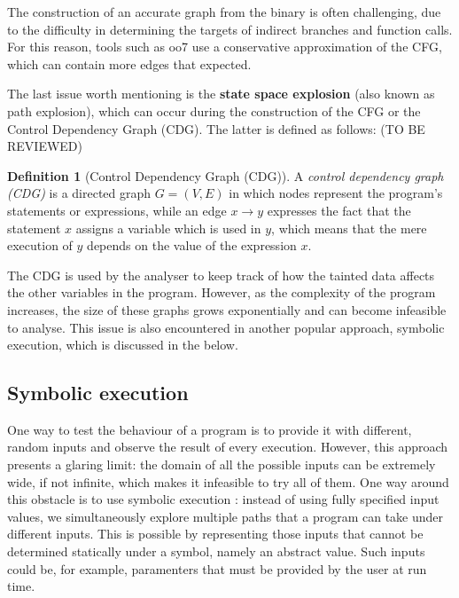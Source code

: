 \documentclass[12pt,a4paper]{book}
\theoremstyle{definition}
\newtheorem{defn}{Definition}
\begin{document}
	The construction of an accurate graph from the binary is often challenging, due to the difficulty in determining the targets of indirect branches and function calls. For this reason, tools such as oo7 \cite{Wang2019} use a conservative approximation of the CFG, which can contain more edges that expected.
	
	The last issue worth mentioning is the \textbf{state space explosion} (also known as path explosion), which can occur during the construction of the CFG or the Control Dependency Graph (CDG). The latter is defined as follows: (TO BE REVIEWED)
	
	\begin{defn}[Control Dependency Graph (CDG)]
		A \textit{control dependency graph (CDG)} \cite{Krinke2007} is a directed graph $G=(V,E)$ in which nodes represent the program's statements or expressions, while an edge $x\rightarrow y$ expresses the fact that the statement $x$ assigns a variable which is used in $y$, which means that the mere execution of $y$ depends on the value of the expression $x$. 
	\end{defn}
	The CDG is used by the analyser to keep track of how the tainted data affects the other variables in the program. However, as the complexity of the program increases, the size of these graphs grows exponentially and can become infeasible to analyse. This issue is also encountered in another popular approach, symbolic execution, which is discussed in the below. 
	\subsection{Symbolic execution}
	One way to test the behaviour of a program is to provide it with different, random inputs and observe the result of every execution. However, this approach presents a glaring limit: the domain of all the possible inputs can be extremely wide, if not infinite, which makes it infeasible to try all of them. One way around this obstacle is to use symbolic execution \cite{Baldoni2018}: instead of using fully specified input values, we simultaneously explore multiple paths that a program can take under different inputs. This is possible by representing those inputs that cannot be determined statically under a symbol, namely an abstract value. Such inputs could be, for example, paramenters that must be provided by the user at run time.
	
\end{document}
